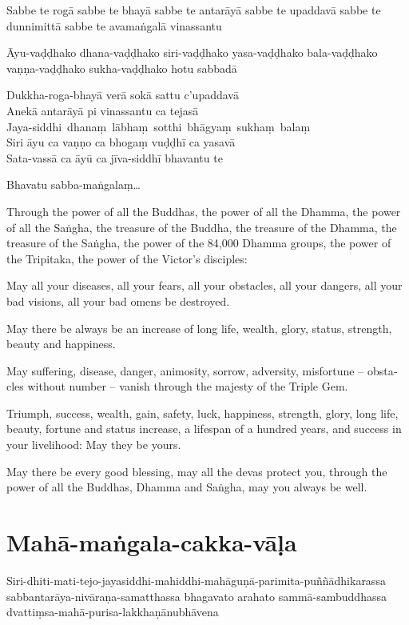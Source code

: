 Sabbe te rogā sabbe te bhayā sabbe te antarāyā sabbe te upaddavā sabbe te
dunnimittā sabbe te avamaṅgalā vinassantu

Āyu-vaḍḍhako dhana-vaḍḍhako siri-vaḍḍhako yasa-vaḍḍhako bala-vaḍḍhako
vaṇṇa-vaḍḍhako sukha-vaḍḍhako hotu sabbadā

Dukkha-roga-bhayā verā sokā sattu c'upaddavā\\
Anekā antarāyā pi vinassantu ca tejasā\\
\mbox{Jaya-siddhi dhanaṃ lābhaṃ sotthi bhāgyaṃ sukhaṃ balaṃ}\\
Siri āyu ca vaṇṇo ca bhogaṃ vuḍḍhī ca yasavā\\
Sata-vassā ca āyū ca jīva-siddhī bhavantu te

Bhavatu sabba-maṅgalaṃ\ldots{}

\begin{english}
  Through the power of all the Buddhas, the power of all the Dhamma, the power of all the Saṅgha,
  the treasure of the Buddha, the treasure of the Dhamma, the treasure of the Saṅgha,
  the power of the 84,000 Dhamma groups, the power of the Tripitaka, the power
  of the Victor's disciples:

  May all your diseases, all your fears, all your obstacles,
  all your dangers, all your bad visions, all your bad omens be destroyed.

  May there be always be an increase of long life, wealth, glory, status,
  strength, beauty and happiness.

  May suffering, disease, danger, animosity, sorrow, adversity, misfortune --
  obstacles without number -- vanish through the majesty of the Triple Gem.

  Triumph, success, wealth, gain, safety, luck, happiness, strength, glory, long
  life, beauty, fortune and status increase, a lifespan of a hundred years, and
  success in your livelihood: May they be yours.

  May there be every good blessing, may all the devas protect you, through the
  power of all the Buddhas, Dhamma and Saṅgha, may you always be well.
\end{english}

\section{Mahā-maṅgala-cakka-vāḷa}


Siri-dhiti-mati-tejo-jayasiddhi-mahiddhi-mahāguṇā-parimita-puññādhikarassa
sabbantarāya-nivāraṇa-samatthassa bhagavato arahato sammā-sambuddhassa
dvattiṃsa-mahā-purisa-lakkhaṇānubhāvena


